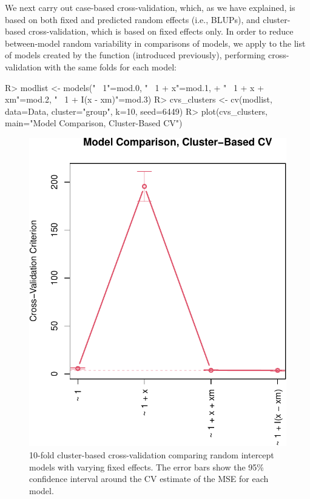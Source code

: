 \documentclass[
]{jss}
\begin{document}
We next carry out case-based cross-validation, which, as we have
explained, is based on both fixed and predicted random effects (i.e.,
BLUPs), and cluster-based cross-validation, which is based on fixed
effects only. In order to reduce between-model random variability in
comparisons of models, we apply  to the list of models
created by the  function (introduced previously),
performing cross-validation with the same folds for each model:

\begin{CodeChunk}
\begin{CodeInput}
R> modlist <- models("~ 1"=mod.0, "~ 1 + x"=mod.1, 
+                   "~ 1 + x + xm"=mod.2, "~ 1 + I(x - xm)"=mod.3)
R> cvs_clusters <- cv(modlist, data=Data, cluster="group", k=10, seed=6449)
R> plot(cvs_clusters, main="Model Comparison, Cluster-Based CV")
\end{CodeInput}
\begin{figure}

{\centering \includegraphics[width=1\linewidth]{JSS-article_files/figure-latex/cross-validation-clusters-1} 

}

\caption[10-fold cluster-based cross-validation comparing random intercept models with varying fixed effects]{10-fold cluster-based cross-validation comparing random intercept models with varying fixed effects. The error bars show the 95\% confidence interval around the CV estimate of the MSE for each model.}\label{fig:cross-validation-clusters}
\end{figure}
\end{CodeChunk}
\end{document}

